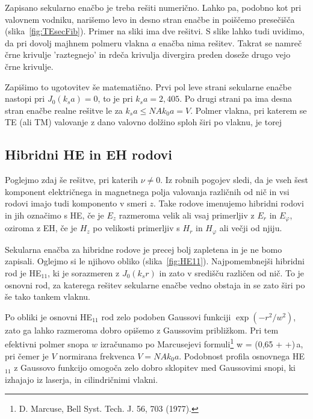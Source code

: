 Zapisano sekularno enačbo je treba rešiti numerično. Lahko pa, podobno kot pri valovnem
vodniku, narišemo levo in desno stran enačbe in poiščemo
presečišča (slika~\ref{fig:TEsecFib}). Primer na sliki ima dve rešitvi. S slike lahko 
tudi uvidimo, da pri dovolj majhnem polmeru vlakna $a$ enačba nima rešitev. Takrat se namreč
črne krivulje 'raztegnejo' in rdeča krivulja divergira preden doseže drugo vejo črne krivulje.

Zapišimo to ugotovitev še matematično. Prvi pol leve strani sekularne enačbe nastopi pri 
$J_0 (k_s a)  = 0$, to je pri $k_s a= 2,405$. 
Po drugi strani pa ima desna stran enačbe realne rešitve le za $k_s a \le NA k_0 a = V$.
Polmer vlakna, pri katerem se TE (ali TM) valovanje z dano valovno dolžino sploh širi po 
vlaknu, je torej 

\subsection*{Hibridni HE in EH rodovi}
Poglejmo zdaj še rešitve, pri katerih $\nu \neq 0$. Iz robnih pogojev sledi, da je 
vseh šest komponent električnega in magnetnega polja valovanja različnih od nič in vsi rodovi
imajo tudi komponento v smeri $z$. Take rodove imenujemo hibridni rodovi in jih 
označimo s HE, če je $E_z$ razmeroma velik ali vsaj primerljiv z $E_r$ in $E_\varphi$, 
oziroma z EH, če je $H_z$ po velikosti primerljiv s $H_r$ in $H_\varphi$ ali večji od njiju. 

Sekularna enačba za hibridne rodove je precej bolj zapletena in je ne bomo zapisali. 
Oglejmo si le njihovo obliko (slika~\ref{fig:HE11}). Najpomembnejši hibridni rod je HE$_{11}$, 
ki je sorazmeren z $J_0(k_sr)$ in zato v središču različen od nič. 
To je osnovni rod, za katerega rešitev sekularne enačbe vedno obstaja in se
zato širi po še tako tankem vlaknu. 

Po obliki je osnovni HE$_{11}$ rod zelo podoben Gaussovi funkciji $\exp(-r^2/w^2)$,
zato ga lahko razmeroma dobro opišemo z Gaussovim približkom. 
Pri tem efektivni polmer snopa
$w$ izračunamo po Marcusejevi formuli\footnote{D. Marcuse, Bell Syst. Tech. J. 56, 703 (1977).}
\beq 
w = (0,65 + +)\,a,
\label{Marcuse}
\eeq
pri čemer je $V$ normirana frekvenca $V = NA k_0 a$. Podobnost profila osnovnega
HE$_{11}$ z Gaussovo funkcijo omogoča zelo dobro sklopitev med Gaussovimi
snopi, ki izhajajo iz laserja, in cilindričnimi vlakni.

